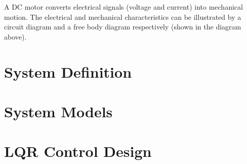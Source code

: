 \documentclass{article}
\begin{document}
\begin{maplegroup}
\begin{center}
\begin{Maple Normal}{
}\end{Maple Normal}
\end{center}
\end{maplegroup}
\begin{maplelatex}\begin{Maple Normal}{
A DC motor converts electrical signals (voltage and current) into mechanical motion. The electrical and mechanical characteristics can be illustrated by a circuit diagram and a free body diagram respectively (shown in the diagram above).}\end{Maple Normal}
\end{maplelatex}
\begin{maplegroup}
\begin{Maple Normal}{
}\end{Maple Normal}
\end{maplegroup}
\section{\textbf{System Definition}}
\section{\textbf{System Models}}
\section{\textbf{LQR Control Design}}
\end{document}
